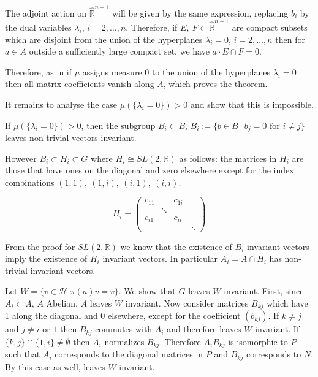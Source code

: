 \documentclass[
  12pt
]{article}
\numberwithin{equation}{section}
\theoremstyle{plain}
\newcommand{\G}{\ensuremath{G}\xspace}
\newcommand{\bbr}{\ensuremath{\mathbb{R}}\xspace}
\newcommand{\hilb}{\ensuremath{\mathscr{H}}\xspace}
\newcommand{\sltr}{\ensuremath{SL(2, \mathbb{R})}\xspace}
\begin{document}
  The adjoint action on $\hat{\bbr}^{n-1}$ will be given by the same expression,
  replacing $b_i$ by the dual variables $\lambda_i$, $i = 2, \dots , n$.
  Therefore, if $E,\ F \subset \hat{\bbr}^{n-1}$ are
  compact subsets which are disjoint from the union of the hyperplanes $\lambda_i = 0$,
  $i = 2, \dots , n$ then for $a\in A$ outside a sufficiently large compact set, we have
  $a\cdot E \cap F = 0$.

  Therefore, as in  if $\mu$ assigns measure $0$ to the union of the hyperplanes $\lambda_i =0$ then all matrix coefficients vanish along $A$, which proves the theorem.

  It remains to analyse the case $\mu(\{\lambda_i=0\}) > 0$ and show that this is impossible.

  If $\mu(\{\lambda_i=0\}) > 0$, then the subgroup $B_i \subset B$, $B_i := \{b \in B\ |\ b_j=0 \text{ for } i\neq j\}$ leaves non-trivial vectors invariant.

  However $B_i \subset H_i \subset G$ where $H_i \cong \sltr$ as follows: the matrices in $H_i$ are those that have ones on the diagonal and zero elsewhere except for the index combinations $(1,1),\ (1,i),\ (i,1),\ (i,i)$.

  $$
  H_i = \begin{pmatrix}
    c_{11} & & c_{1i} & \\
           & \ddots & & \\
    c_{i1} & & c_{ii}&  \\
           & & & \ddots
  \end{pmatrix}
  $$

  From the proof for \sltr we know that the existence of $B_i$-invariant
  vectors imply the existence of $H_i$ invariant vectors. In particular
  $A_i = A \cap H_i$ has non-trivial invariant vectors.

  Let $W = \{v \in \hilb | \pi(a)v=v\}$. We show that \G leaves $W$ invariant.
  First, since $A_i \subset A$, $A$ Abelian, $A$ leaves $W$ invariant. Now
  consider matrices $B_{kj}$ which have 1 along the diagonal and 0 elsewhere,
  except for the coefficient $(b_{kj})$. If $k\neq j$ and $j\neq i$ or $1$ then
  $B_{kj}$ commutes with $A_i$ and therefore leaves $W$ invariant. If
  $\{k,j\}\cap \{1,i\} \neq \emptyset$ then $A_i$ normalizes $B_{kj}$.
  Therefore $A_iB_{kj}$ is isomorphic to $P$ such that $A_i$ corresponds to the
  diagonal matrices in $P$ and $B_{kj}$ corresponds to $N$. By
   this case as well, leaves $W$ invariant.
\end{document}
